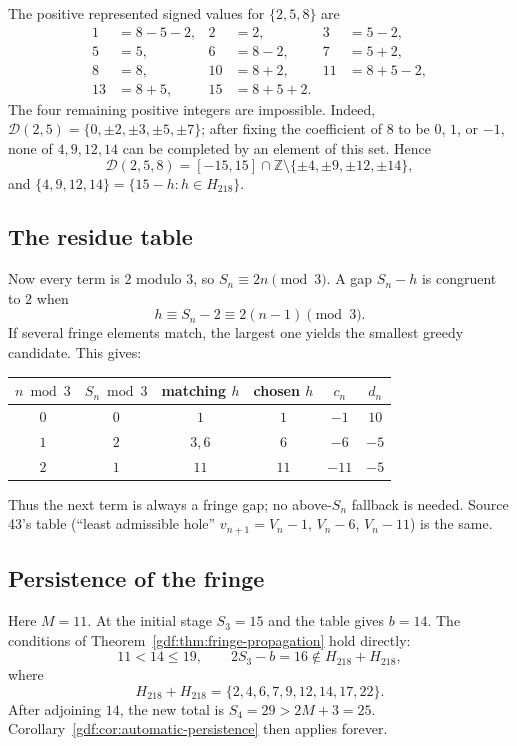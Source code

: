 \documentclass[11pt,a4paper]{article}
\numberwithin{equation}{section}
\theoremstyle{definition}
\theoremstyle{remark}
\theoremstyle{plain}
\newcommand{\Z}{\mathbb Z}
\newcommand{\cD}{\mathcal D}
\begin{document}
The positive represented signed values for $\{2,5,8\}$ are
\[
\begin{aligned}
 1&=8-5-2, &2&=2,       &3&=5-2,\\
 5&=5,     &6&=8-2,     &7&=5+2,\\
 8&=8,     &10&=8+2,    &11&=8+5-2,\\
 13&=8+5,  &15&=8+5+2.&&
\end{aligned}
\]
The four remaining positive integers are impossible.  Indeed,
$\cD(2,5)=\{0,\pm2,\pm3,\pm5,\pm7\}$; after fixing the coefficient of $8$ to
be $0$, $1$, or $-1$, none of $4,9,12,14$ can be completed by an element of
this set.  Hence
\begin{equation}\label{gdf:eq:v-base3}
 \cD(2,5,8)=[-15,15]\cap\Z\setminus
 \{\pm4,\pm9,\pm12,\pm14\},
\end{equation}
and $\{4,9,12,14\}=\{15-h:h\in H_{218}\}$.

\subsection{The residue table}

Now every term is $2$ modulo $3$, so
$S_n\equiv2n\pmod3$.  A gap $S_n-h$ is congruent to $2$ when
\[
 h\equiv S_n-2\equiv2(n-1)\pmod3.
\]
If several fringe elements match, the largest one yields the smallest greedy
candidate.  This gives:

\begin{center}
\begin{tabular}{cccccc}
\toprule
$n\bmod3$ & $S_n\bmod3$ & matching $h$ & chosen $h$ & $c_n$ & $d_n$\\
\midrule
$0$ & $0$ & $1$ & $1$ & $-1$ & $10$\\
$1$ & $2$ & $3,6$ & $6$ & $-6$ & $-5$\\
$2$ & $1$ & $11$ & $11$ & $-11$ & $-5$\\
\bottomrule
\end{tabular}
\end{center}

Thus the next term is always a fringe gap; no above-$S_n$ fallback is needed.
Source 43's table (``least admissible hole'' $v_{n+1}=V_n-1$, $V_n-6$,
$V_n-11$) is the same.

\subsection{Persistence of the fringe}

Here $M=11$.  At the initial stage $S_3=15$ and the table gives $b=14$.
The conditions of Theorem~\ref{gdf:thm:fringe-propagation} hold directly:
\[
 11<14\le19,
 \qquad
 2S_3-b=16\notin H_{218}+H_{218},
\]
where
\begin{equation}\label{gdf:eq:H218sum}
 H_{218}+H_{218}=\{2,4,6,7,9,12,14,17,22\}.
\end{equation}
After adjoining $14$, the new total is $S_4=29>2M+3=25$.
Corollary~\ref{gdf:cor:automatic-persistence} then applies forever.
\end{document}
